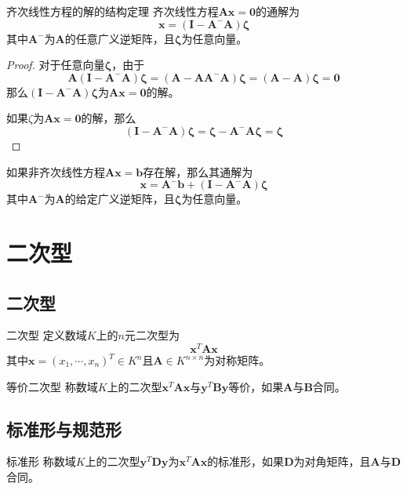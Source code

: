 \documentclass[lang = cn, scheme = chinese, thmcnt = section]{elegantbook}
\newcommand{\bs}{\boldsymbol}          %
\begin{document}
\begin{theorem}{齐次线性方程的解的结构定理}
	齐次线性方程$\bs{Ax}=\bs{0}$的通解为
	$$
	\bs{x}=(\bs{I}-\bs{A}^-\bs{A})\bs{\zeta}
	$$
	其中$\bs{A}^-$为$\bs{A}$的任意广义逆矩阵，且$\bs{\zeta}$为任意向量。
\end{theorem}

\begin{proof}
	对于任意向量$\bs{\zeta}$，由于
	$$
	\bs{A}(\bs{I}-\bs{A}^-\bs{A})\bs{\zeta}
	=(\bs{A}-\bs{AA}^-\bs{A})\bs{\zeta}
	=(\bs{A}-\bs{A})\bs{\zeta}
	=\bs{0}
	$$
	那么$(\bs{I}-\bs{A}^-\bs{A})\bs{\zeta}$为$\bs{Ax}=\bs{0}$的解。
	
	如果$\zeta$为$\bs{Ax}=\bs{0}$的解，那么
	$$
	(\bs{I}-\bs{A}^-\bs{A})\bs{\zeta}
	=\bs{\zeta}-\bs{A}^-\bs{A}\bs{\zeta}
	=\bs{\zeta}
	$$
\end{proof}

\begin{corollary}
	如果非齐次线性方程$\bs{Ax}=\bs{b}$存在解，那么其通解为
	$$
	\bs{x}=\bs{A}^-\bs{b}+(\bs{I}-\bs{A}^-\bs{A})\bs{\zeta}
	$$
	其中$\bs{A}^-$为$\bs{A}$的给定广义逆矩阵，且$\bs{\zeta}$为任意向量。
\end{corollary}

\chapter{二次型}

\section{二次型}

\begin{definition}{二次型}
	定义数域$K$上的$n$元二次型为
	$$
	\bs{x}^T\bs{Ax}
	$$
	其中$\bs{x}=(x_1,\cdots,x_n)^T\in K^n$且$\bs{A}\in K^{n\times n}$为对称矩阵。
\end{definition}

\begin{definition}{等价二次型}
	称数域$K$上的二次型$\bs{x}^T\bs{Ax}$与$\bs{y}^T\bs{By}$等价，如果$\bs{A}$与$\bs{B}$合同。
\end{definition}

\section{标准形与规范形}

\begin{definition}{标准形}
	称数域$K$上的二次型$\bs{y}^T\bs{Dy}$为$\bs{x}^T\bs{Ax}$的标准形，如果$\bs{D}$为对角矩阵，且$\bs{A}$与$\bs{D}$合同。
\end{definition}
\end{document}
